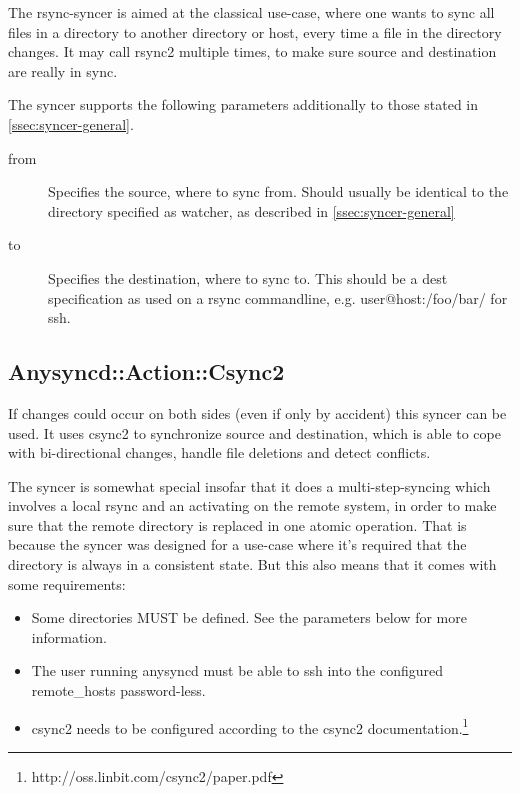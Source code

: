 The rsync-syncer is aimed at the classical use-case, where one wants to sync
all files in a directory to another directory or host, every time a file in the
directory changes. It may call rsync2 multiple times, to make sure source
and destination are really in sync.

The syncer supports the following parameters additionally to those
stated in \ref{ssec:syncer-general}.

\begin{description}
    \item[from] Specifies the source, where to sync from. Should usually be
        identical to the directory specified as watcher, as described in
        \ref{ssec:syncer-general}

    \item[to] Specifies the destination, where to sync to. This should be a
        dest specification as used on a rsync commandline, e.g.
        user@host:/foo/bar/ for ssh.
\end{description}

\subsection{Anysyncd::Action::Csync2}

If changes could occur on both sides (even if only by accident) this syncer
can be used. It uses csync2 to synchronize source and destination, which is
able to cope with bi-directional changes, handle file deletions and detect
conflicts. 

The syncer is somewhat special insofar that it does a multi-step-syncing
which involves a local rsync and an activating on the remote system, in order to
make sure that the remote directory is replaced in one atomic operation. That
is because the syncer was designed for a use-case where it's required that the
directory is always in a consistent state. But this also means that it comes
with some requirements:

\begin{itemize}
    \item Some directories MUST be defined. See the parameters below for more
        information.
    \item The user running anysyncd must be able to ssh into the configured
        remote_hosts password-less.
    \item csync2 needs to be configured according to the csync2
        documentation.\footnote{http://oss.linbit.com/csync2/paper.pdf} 
\end{itemize}

